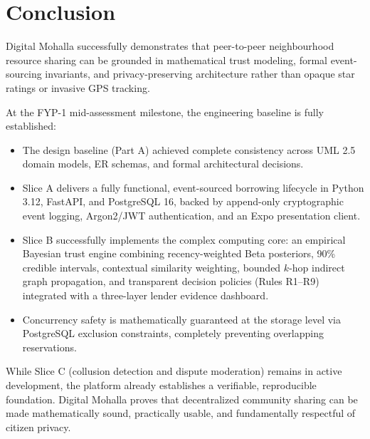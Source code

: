 \chapter{Conclusion}

Digital Mohalla successfully demonstrates that peer-to-peer neighbourhood resource sharing can be grounded in mathematical trust modeling, formal event-sourcing invariants, and privacy-preserving architecture rather than opaque star ratings or invasive GPS tracking.

At the FYP-1 mid-assessment milestone, the engineering baseline is fully established:
\begin{itemize}
    \item The design baseline (Part A) achieved complete consistency across UML 2.5 domain models, ER schemas, and formal architectural decisions.
    \item Slice A delivers a fully functional, event-sourced borrowing lifecycle in Python 3.12, FastAPI, and PostgreSQL 16, backed by append-only cryptographic event logging, Argon2/JWT authentication, and an Expo presentation client.
    \item Slice B successfully implements the complex computing core: an empirical Bayesian trust engine combining recency-weighted Beta posteriors, 90\% credible intervals, contextual similarity weighting, bounded $k$-hop indirect graph propagation, and transparent decision policies (Rules R1--R9) integrated with a three-layer lender evidence dashboard.
    \item Concurrency safety is mathematically guaranteed at the storage level via PostgreSQL exclusion constraints, completely preventing overlapping reservations.
\end{itemize}

While Slice C (collusion detection and dispute moderation) remains in active development, the platform already establishes a verifiable, reproducible foundation. Digital Mohalla proves that decentralized community sharing can be made mathematically sound, practically usable, and fundamentally respectful of citizen privacy.
